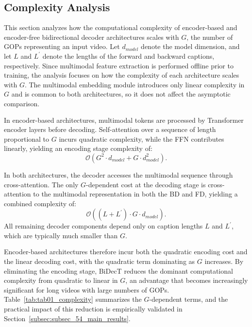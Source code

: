 \subsection{Complexity Analysis}
\label{subsec:subsec_47_complexity}
This section analyzes how the computational complexity of encoder-based and encoder-free bidirectional decoder architectures scales with $G$, the number of GOPs representing an input video. Let $d_{model}$ denote the model dimension, and let $L$ and $L^\prime$ denote the lengths of the forward and backward captions, respectively. Since multimodal feature extraction is performed offline prior to training, the analysis focuses on how the complexity of each architecture scales with $G$. The multimodal embedding module introduces only linear complexity in $G$ and is common to both architectures, so it does not affect the asymptotic comparison.

In encoder-based architectures, multimodal tokens are processed by Transformer encoder layers before decoding. Self-attention over a sequence of length proportional to $G$ incurs quadratic complexity, while the FFN contributes linearly, yielding an encoding stage complexity of:
\begin{equation}
\mathcal{O}\left(G^2\cdot d_{model}+G\cdot d_{model}^2\right).
\end{equation}

In both architectures, the decoder accesses the multimodal sequence through cross-attention. The only $G$-dependent cost at the decoding stage is cross-attention to the multimodal representation in both the BD and FD, yielding a combined complexity of:
\begin{equation}
\mathcal{O}\left((L+L^\prime)\cdot G\cdot d_{model}\right).
\end{equation}
All remaining decoder components depend only on caption lengths $L$ and $L^\prime$, which are typically much smaller than $G$.

Encoder-based architectures therefore incur both the quadratic encoding cost and the linear decoding cost, with the quadratic term dominating as $G$ increases. By eliminating the encoding stage, BiDecT reduces the dominant computational complexity from quadratic to linear in $G$, an advantage that becomes increasingly significant for long videos with large numbers of GOPs. Table~\ref{tab:tab01_complexity} summarizes the $G$-dependent terms, and the practical impact of this reduction is empirically validated in Section~\ref{subsec:subsec_54_main_results}.

